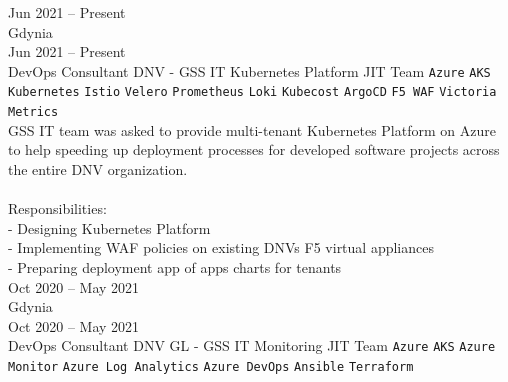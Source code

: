 \documentclass[9pt]{style/developercv}
\begin{document}
\begin{entrylist}
	\entry
    {Jun 2021 -- Present\\\footnotesize{Gdynia}
    \\Jun 2021 -- Present\\\footnotesize{DevOps Consultant}}
		{DNV - GSS IT Kubernetes Platform}
		{JIT Team}
		{
			\texttt{Azure}\slashsep
      \texttt{AKS}\slashsep
			\texttt{Kubernetes}\slashsep
			\texttt{Istio}\slashsep
			\texttt{Velero}\slashsep
      \texttt{Prometheus}\slashsep
      \texttt{Loki}\slashsep
      \texttt{Kubecost}\slashsep
      \texttt{ArgoCD}\slashsep
      \texttt{F5 WAF}\slashsep
      \texttt{Victoria Metrics}\\

      GSS IT team was asked to provide multi-tenant Kubernetes Platform on Azure to help speeding up deployment processes for developed software projects across the entire DNV organization.\\
      \\
      Responsibilities:\\
      - Designing Kubernetes Platform\\
      - Implementing WAF policies on existing DNVs F5 virtual appliances\\
      - Preparing deployment app of apps charts for tenants\\
		}
	\entry
    {Oct 2020 -- May 2021\\\footnotesize{Gdynia}
    \\Oct 2020 -- May 2021\\\footnotesize{DevOps Consultant}}
		{DNV GL - GSS IT Monitoring}
		{JIT Team}
		{
			\texttt{Azure}\slashsep
      \texttt{AKS}\slashsep
			\texttt{Azure Monitor}\slashsep
			\texttt{Azure Log Analytics}\slashsep
			\texttt{Azure DevOps}\slashsep
      \texttt{Ansible}\slashsep
      \texttt{Terraform}\\

}
\end{entrylist}
\end{document}
